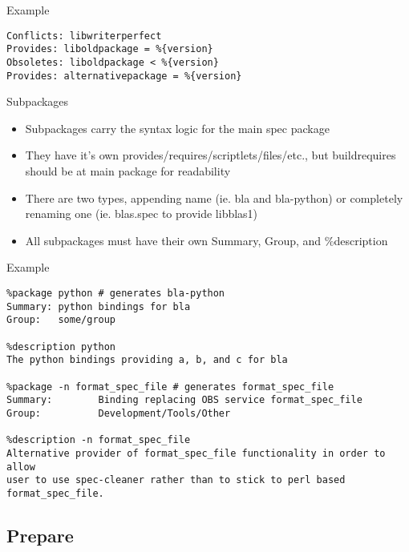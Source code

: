 \documentclass{beamer}
\begin{document}
\begin{frame}[fragile]{Example}
	\begin{small}
	\begin{verbatim}
Conflicts: libwriterperfect
Provides: liboldpackage = %{version}
Obsoletes: liboldpackage < %{version}
Provides: alternativepackage = %{version}
	\end{verbatim}
	\end{small}
\end{frame}

\begin{frame}[t]{Subpackages}
	\begin{itemize}
	\item Subpackages carry the syntax logic for the main spec package
    \item They have it's own provides/requires/scriptlets/files/etc., but buildrequires should be at main package for readability
    \item There are two types, appending name (ie. bla and bla-python) or completely renaming one (ie. blas.spec to provide libblas1)
    \item All subpackages must have their own Summary, Group, and \%description
	\end{itemize}
\end{frame}

\begin{frame}[fragile]{Example}
	\begin{small}
	\begin{verbatim}
%package python # generates bla-python
Summary: python bindings for bla
Group:   some/group

%description python
The python bindings providing a, b, and c for bla

%package -n format_spec_file # generates format_spec_file
Summary:        Binding replacing OBS service format_spec_file
Group:          Development/Tools/Other

%description -n format_spec_file
Alternative provider of format_spec_file functionality in order to allow
user to use spec-cleaner rather than to stick to perl based format_spec_file.
	\end{verbatim}
	\end{small}
\end{frame}

\subsection{Prepare}
\end{document}
